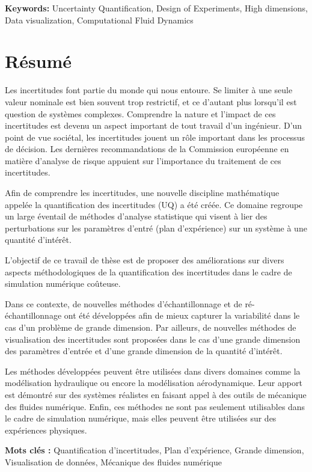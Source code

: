 \textbf{Keywords:} Uncertainty Quantification, Design of Experiments, High dimensions, Data visualization, Computational Fluid Dynamics %

{}
\section*{Résumé}

Les incertitudes font partie du monde qui nous entoure. Se limiter à une seule valeur nominale est bien souvent trop restrictif, et ce d'autant plus lorsqu'il est question de systèmes complexes. Comprendre la nature et l'impact de ces incertitudes est devenu un aspect important de tout travail d'un ingénieur. D'un point de vue sociétal, les incertitudes jouent un rôle important dans les processus de décision. Les dernières recommandations de la Commission européenne en matière d'analyse de risque appuient sur l'importance du traitement de ces incertitudes.

Afin de comprendre les incertitudes, une nouvelle discipline mathématique appelée la quantification des incertitudes (UQ) a été créée. Ce domaine regroupe un large éventail de méthodes d'analyse statistique qui visent à lier des perturbations sur les paramètres d'entré (plan d'expérience) sur un système à une quantité d'intérêt.

L'objectif de ce travail de thèse est de proposer des améliorations sur divers aspects méthodologiques de la quantification des incertitudes dans le cadre de simulation numérique coûteuse.

Dans ce contexte, de nouvelles méthodes d'échantillonnage et de ré-échantillonnage ont été développées afin de mieux capturer la variabilité dans le cas d'un problème de grande dimension. Par ailleurs, de nouvelles méthodes de visualisation des incertitudes sont proposées dans le cas d'une grande dimension des paramètres d'entrée et d'une grande dimension de la quantité d'intérêt.

Les méthodes développées peuvent être utilisées dans divers domaines comme la modélisation hydraulique ou encore la modélisation aérodynamique. Leur apport est démontré sur des systèmes réalistes en faisant appel à des outils de mécanique des fluides numérique. Enfin, ces méthodes ne sont pas seulement utilisables dans le cadre de simulation numérique, mais elles peuvent être utilisées sur des expériences physiques.

\textbf{Mots clés :} Quantification d'incertitudes, Plan d'expérience, Grande dimension, Visualisation de données, Mécanique des fluides numérique %

